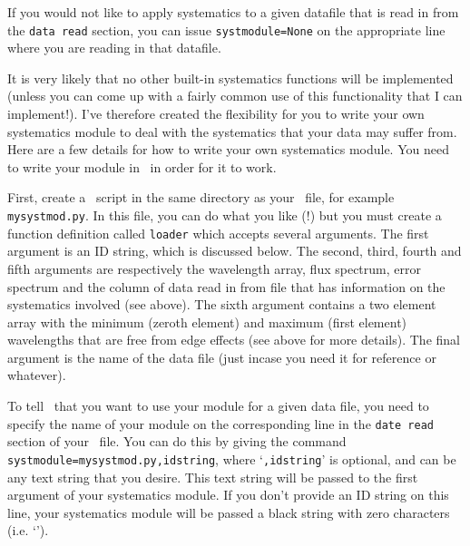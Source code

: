 If you would not like to apply systematics to a given datafile that is read in
from the \texttt{data read} section, you can issue \texttt{systmodule=None}
on the appropriate line where you are reading in that datafile.

It is very likely that no other built-in systematics functions will be implemented
(unless you can come up with a fairly common use of this functionality that I can
implement!). I've therefore created the flexibility for you to write your own
systematics module to deal with the systematics that your data may suffer
from. Here are a few details for how to write your own systematics module.
You need to write your module in \python\ in order for it to work.

First, create a \python\ script in the same directory as your \dmod\ file, for example \texttt{mysystmod.py}.
In this file, you can do what you like (!) but you must create a function definition called \texttt{loader}
which accepts several arguments. The first argument is an ID string, which is discussed below. The
second, third, fourth and fifth arguments are respectively the wavelength array, flux spectrum, error spectrum
and the column of data read in from file that has information on the systematics involved (see above).
The sixth argument contains a two element array with the minimum (zeroth element) and maximum
(first element) wavelengths that are free from edge effects (see above for more details). The final
argument is the name of the data file (just incase you need it for reference or whatever).

To tell \alis\ that you want to use your module for a given data file, you need to specify the name of your
module on the corresponding line in the \texttt{date read} section of your \dmod\ file. You can do this by
giving the command \texttt{systmodule=mysystmod.py,idstring}, where `\texttt{,idstring}' is optional, and
can be any text string that you desire. This text string will be passed to the first argument of your
systematics module. If you don't provide an ID string on this line, your systematics module will be passed
a black string with zero characters (i.e. `').


